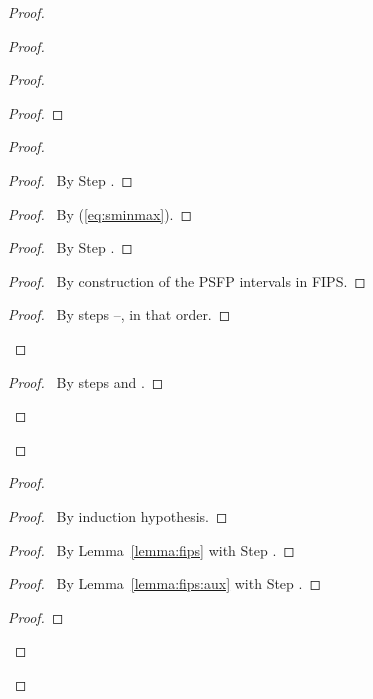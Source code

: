 \begin{proof}
\begin{proof}
\begin{proof}
\begin{proof}
	\end{proof}
	\begin{proof}
	  \begin{proof}
	    \pf\ By Step .
	  \end{proof}
	  \begin{proof}
	    \pf\ By (\ref{eq:sminmax}).
	  \end{proof}
	  \begin{proof}
	    \pf\ By Step .
	  \end{proof}
	  \begin{proof}
	    \pf\ By construction of the PSFP intervals in FIPS.
	  \end{proof}
	  \qedstep
	  \begin{proof}
	    \pf\ By steps --, in that order.
	  \end{proof}
	\end{proof}
	\qedstep
	\begin{proof}
	  \pf\ By steps  and .
	\end{proof}
      \end{proof}
    \end{proof}
    \begin{proof}
      \begin{proof}
	\pf\ By induction hypothesis.
      \end{proof}
      \begin{proof}
	\pf\ By Lemma~\ref{lemma:fips} with Step .
      \end{proof}
      \begin{proof}
	\pf\ By Lemma~\ref{lemma:fips:aux} with Step .
      \end{proof}
      \qedstep
      \begin{proof}

\end{proof}
\end{proof}
\end{proof}
